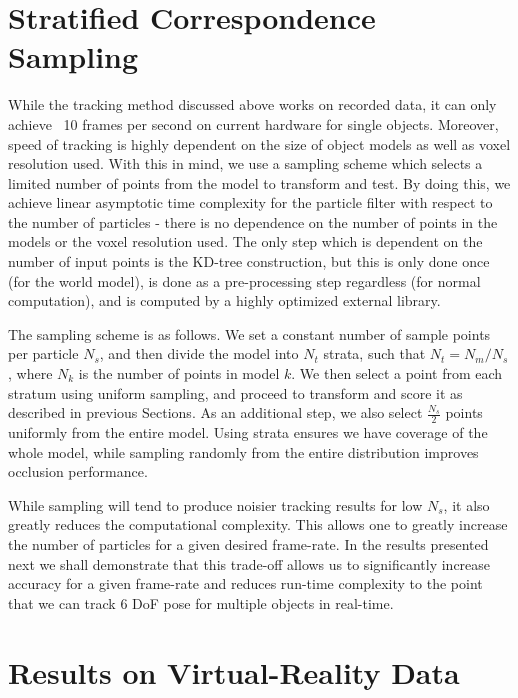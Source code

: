 \section{Stratified Correspondence Sampling}
While the tracking method discussed above works on recorded data, it can only achieve ~10 frames per second on current hardware for single objects. Moreover, speed of tracking is highly dependent on the size of object models as well as voxel resolution used. With this in mind, we use a sampling scheme which selects a limited number of points from the model to transform and test. By doing this, we achieve linear asymptotic time complexity for the particle filter with respect to the number of particles - there is no dependence on the number of points in the models or the voxel resolution used. The only step which is dependent on the number of input points is the KD-tree construction, but this is only done once (for the world model), is done as a pre-processing step regardless (for normal computation), and is computed by a highly optimized external library.

The sampling scheme is as follows. We set a constant number of sample points per particle $N_s$, and then divide the model into $N_t$ strata, such that $N_t = N_m / N_s$, where $N_k$ is the number of points in model $k$. We then select a point from each stratum using uniform sampling, and proceed to transform and score it as described in previous Sections. As an additional step, we also select $\frac{N_s}{2}$ points uniformly from the entire model. Using strata ensures we have coverage of the whole model, while sampling randomly from the entire distribution improves occlusion performance. 


While sampling will tend to produce noisier tracking results for low $N_s$, it also greatly reduces the computational complexity. This allows one to greatly increase the number of particles for a given desired frame-rate. In the results presented next we shall demonstrate that this trade-off allows us to significantly increase accuracy for a given frame-rate and reduces run-time complexity to the point that we can track 6 DoF pose for multiple objects in real-time.   

\section{Results on Virtual-Reality Data}

